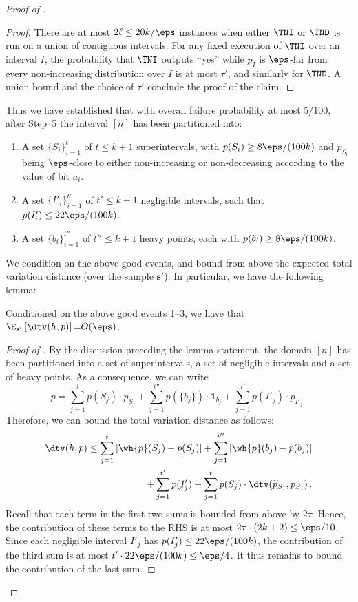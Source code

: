 \begin{proof}[Proof of ]
\begin{proof}
There are at most $2\ell \leq 20k/\eps$ instances when either
$\TNI$ or $\TND$ is run on a union of contiguous intervals.
For any fixed execution of $\TNI$ over an interval $I$,
the probability that $\TNI$ outputs ``yes''
while $p_I$ is $\eps$-far from every non-increasing distribution over $I$
is at most $\tau'$, and similarly for $\TND$.  A union bound
and the choice of $\tau'$ conclude the proof of the claim.
\end{proof}

Thus we have established that with overall failure probability at most
$5/100$, after Step~5 the interval $[n]$ has been partitioned into:
\begin{enumerate}
\item A set $\{S_i\}_{i=1}^t$ of $t \leq k+1$ superintervals, with $p(S_i) \geq 8\eps/(100k)$
and $p_{S_i}$ being $\eps$-close to either non-increasing or non-decreasing according to the value of bit $a_i$.


\item  A set  $\{I'_i\}_{i=1}^{t'}$ of $t' \leq k+1$ negligible intervals, such that $p(I'_i) \leq 22 \eps/(100k)$.


\item A set $\{b_i\}_{i=1}^{t''}$ of $t'' \leq k+1$ heavy points, each with $p(b_i) \geq 8 \eps/(100k)$.
\end{enumerate}
\noindent We condition on the above good events, and bound from above the expected total variation distance (over the sample $\mathbf{s}'$). In particular, we have the following lemma:

\begin{lemma} \label{lemma:exp-dtv}
{Conditioned on the above good events 1--3,} we have that $\E_{\mathbf{s}'}\left[\dtv(h,p)\right] {=} O(\eps)$.
\end{lemma}

\begin{proof}[Proof of ]
By the discussion preceding the lemma statement,
the domain $[n]$ has been partitioned into a set of superintervals, a set of negligible intervals and a set of heavy points. As a consequence, we can write
$$p  =  \sum_{j=1}^t p(S_j) \cdot p_{S_j} + \sum_{j=1}^{t''} p (\{b_j\}) \cdot {\bm 1}_{b_j} + \sum_{j=1}^{t'} p (I'_j) \cdot p_{I'_j} \,.$$
Therefore, we can bound the total variation distance as follows:
\begin{eqnarray*}
\dtv(h,p) \leq  \sum_{j=1}^{t} |  \wh{p}(S_j)  - p(S_j) | +
\sum_{j=1}^{t''} |  \wh{p}(b_j) - p(b_j)| \\ +
\sum_{j=1}^{t'} p (I'_j) +
\sum_{j=1}^{t} p(S_j) \cdot \dtv (\widetilde{p}_{S_j}, p_{S_j})\,.
\end{eqnarray*}
Recall that each term in the first two sums is bounded from above by $2\tau$. Hence, the contribution of these terms to the RHS is at most $2\tau\cdot (2k+2) \leq \eps/10$. Since each negligible interval $I'_j$ has $p(I'_j) \leq 22\eps/(100k)$, the contribution of the third sum is at most $t' \cdot 22 \eps/(100k) \leq \eps/4$. It thus remains to bound the contribution of the last sum.


\end{proof}
\end{proof}
